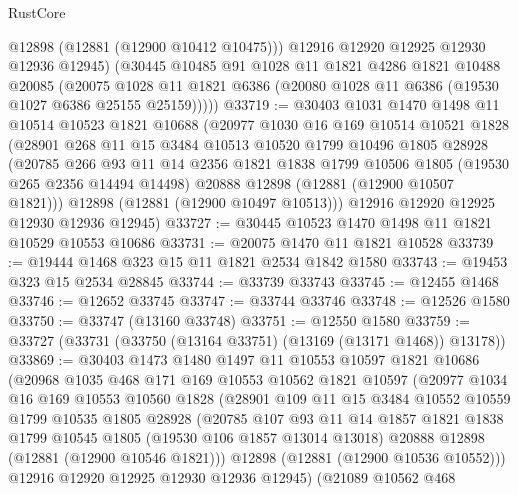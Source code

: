 \begin{lexlean}{RustCore}
\begin{coremodule}
          @12898
          (@12881 (@12900 @10412 @10475)))
        @12916
        @12920
        @12925
        @12930
        @12936
        @12945)
      (@30445
        @10485
        @91
        @1028
        @11
        @1821
        @4286
        @1821
        @10488
        @20085
        (@20075 @1028 @11 @1821 @6386 (@20080 @1028 @11 @6386 (@19530 @1027 @6386 @25155 @25159)))))
@33719 := @30403
    @1031
    @1470
    @1498
    @11
    @10514
    @10523
    @1821
    @10688
    (@20977
      @1030
      @16
      @169
      @10514
      @10521
      @1828
      (@28901
        @268
        @11
        @15
        @3484
        @10513
        @10520
        @1799
        @10496
        @1805
        @28928
        (@20785
          @266
          @93
          @11
          @14
          @2356
          @1821
          @1838
          @1799
          @10506
          @1805
          (@19530 @265 @2356 @14494 @14498)
          @20888
          @12898
          (@12881 (@12900 @10507 @1821)))
        @12898
        (@12881 (@12900 @10497 @10513)))
      @12916
      @12920
      @12925
      @12930
      @12936
      @12945)
@33727 := @30445 @10523 @1470 @1498 @11 @1821 @10529 @10553 @10686
@33731 := @20075 @1470 @11 @1821 @10528
@33739 := @19444 @1468 @323 @15 @11 @1821 @2534 @1842 @1580
@33743 := @19453 @323 @15 @2534 @28845
@33744 := @33739 @33743
@33745 := @12455 @1468
@33746 := @12652 @33745
@33747 := @33744 @33746
@33748 := @12526 @1580
@33750 := @33747 (@13160 @33748)
@33751 := @12550 @1580
@33759 := @33727 (@33731 (@33750 (@13164 @33751) (@13169 (@13171 @1468)) @13178))
@33869 := @30403
    @1473
    @1480
    @1497
    @11
    @10553
    @10597
    @1821
    @10686
    (@20968
      @1035
      @468
      @171
      @169
      @10553
      @10562
      @1821
      @10597
      (@20977
        @1034
        @16
        @169
        @10553
        @10560
        @1828
        (@28901
          @109
          @11
          @15
          @3484
          @10552
          @10559
          @1799
          @10535
          @1805
          @28928
          (@20785
            @107
            @93
            @11
            @14
            @1857
            @1821
            @1838
            @1799
            @10545
            @1805
            (@19530 @106 @1857 @13014 @13018)
            @20888
            @12898
            (@12881 (@12900 @10546 @1821)))
          @12898
          (@12881 (@12900 @10536 @10552)))
        @12916
        @12920
        @12925
        @12930
        @12936
        @12945)
      (@21089
        @10562
        @468

\end{coremodule}
\end{lexlean}
